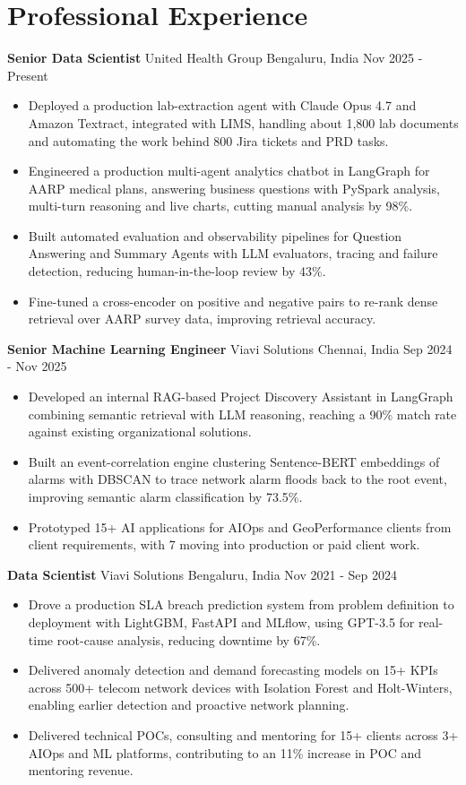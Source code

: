 \documentclass[10pt,a4paper]{article}
\newcommand{\role}[4]{\textbf{#1} \textbar{} #2 \hfill #3 \textbar{} #4\par}
\begin{document}
\section{Professional Experience}
\role{Senior Data Scientist}{United Health Group}{Bengaluru, India}{Nov 2025 - Present}
\begin{itemize}
  \item Deployed a production lab-extraction agent with Claude Opus 4.7 and Amazon Textract, integrated with LIMS, handling about 1,800 lab documents and automating the work behind 800 Jira tickets and PRD tasks.
  \item Engineered a production multi-agent analytics chatbot in LangGraph for AARP medical plans, answering business questions with PySpark analysis, multi-turn reasoning and live charts, cutting manual analysis by 98\%.
  \item Built automated evaluation and observability pipelines for Question Answering and Summary Agents with LLM evaluators, tracing and failure detection, reducing human-in-the-loop review by 43\%.
  \item Fine-tuned a cross-encoder on positive and negative pairs to re-rank dense retrieval over AARP survey data, improving retrieval accuracy.
\end{itemize}
\vspace{3pt}
\role{Senior Machine Learning Engineer}{Viavi Solutions}{Chennai, India}{Sep 2024 - Nov 2025}
\begin{itemize}
  \item Developed an internal RAG-based Project Discovery Assistant in LangGraph combining semantic retrieval with LLM reasoning, reaching a 90\% match rate against existing organizational solutions.
  \item Built an event-correlation engine clustering Sentence-BERT embeddings of alarms with DBSCAN to trace network alarm floods back to the root event, improving semantic alarm classification by 73.5\%.
  \item Prototyped 15+ AI applications for AIOps and GeoPerformance clients from client requirements, with 7 moving into production or paid client work.
\end{itemize}
\vspace{3pt}
\role{Data Scientist}{Viavi Solutions}{Bengaluru, India}{Nov 2021 - Sep 2024}
\begin{itemize}
  \item Drove a production SLA breach prediction system from problem definition to deployment with LightGBM, FastAPI and MLflow, using GPT-3.5 for real-time root-cause analysis, reducing downtime by 67\%.
  \item Delivered anomaly detection and demand forecasting models on 15+ KPIs across 500+ telecom network devices with Isolation Forest and Holt-Winters, enabling earlier detection and proactive network planning.
  \item Delivered technical POCs, consulting and mentoring for 15+ clients across 3+ AIOps and ML platforms, contributing to an 11\% increase in POC and mentoring revenue.
\end{itemize}
\end{document}
